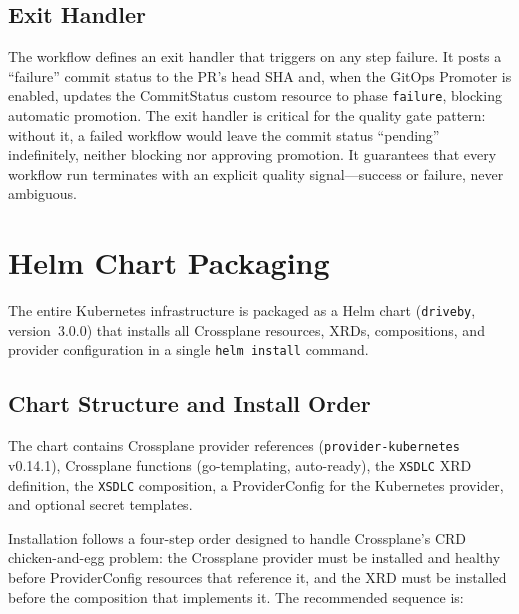 \subsection{Exit Handler}
\label{subsec:exit-handler}

The workflow defines an exit handler that triggers on any step failure. It posts a ``failure'' commit status to the PR's head SHA and, when the GitOps Promoter is enabled, updates the CommitStatus custom resource to phase \texttt{failure}, blocking automatic promotion. The exit handler is critical for the quality gate pattern: without it, a failed workflow would leave the commit status ``pending'' indefinitely, neither blocking nor approving promotion. It guarantees that every workflow run terminates with an explicit quality signal---success or failure, never ambiguous.

\section{Helm Chart Packaging}
\label{sec:helm-chart}

The entire Kubernetes infrastructure is packaged as a Helm chart (\texttt{driveby}, version~3.0.0) that installs all Crossplane resources, XRDs, compositions, and provider configuration in a single \texttt{helm install} command.

\subsection{Chart Structure and Install Order}
\label{subsec:chart-structure}

The chart contains Crossplane provider references (\texttt{provider-kubernetes} v0.14.1), Crossplane functions (go-templating, auto-ready), the \texttt{XSDLC} XRD definition, the \texttt{XSDLC} composition, a ProviderConfig for the Kubernetes provider, and optional secret templates.

Installation follows a four-step order designed to handle Crossplane's CRD chicken-and-egg problem: the Crossplane provider must be installed and healthy before ProviderConfig resources that reference it, and the XRD must be installed before the composition that implements it. The recommended sequence is:

